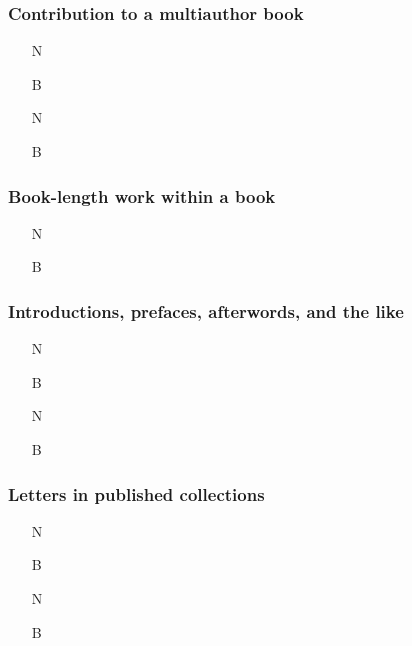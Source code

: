 \documentclass[11pt,letterpaper,oneside]{article}
\begin{document}
\subsubsection{Contribution to a multiauthor book}
\label{14.112}

\begin{itemize}
\item[N] 

\item[B] 

\item[N] 

\item[B] 
\end{itemize}

\setcounter{subsubsection}{113}
\subsubsection{Book-length work within a book}

\begin{itemize}
\item[N] 

\item[B] 
\end{itemize}

\setcounter{subsubsection}{115}
\subsubsection{Introductions, prefaces, afterwords, and the like}

\begin{itemize}
\item[N] 

\item[B] 

\item[N] 

\item[B] 
\end{itemize}

\subsubsection{Letters in published collections}

\begin{itemize}
\item[N] 

\item[B] 

\item[N] 

\item[B] 
\end{itemize}
\end{document}
